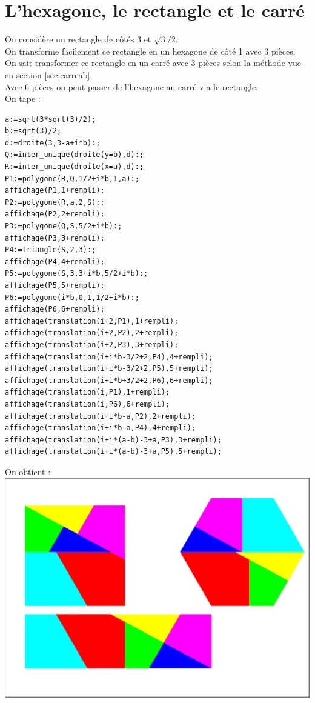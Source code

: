 \documentclass[a4paper,11pt]{book}
\begin{document}
\section{L'hexagone, le rectangle et le carr\'e}
On consid\`ere un rectangle de c\^ot\'es 3 et $\sqrt 3/2$.\\
On transforme facilement ce rectangle en un hexagone de c\^ot\'e 1 avec 3 
pi\`eces.\\
On sait transformer ce rectangle en un carr\'e avec 3 pi\`eces selon la 
m\'ethode vue en section \ref{sec:carreab}.\\  
Avec 6 pi\`eces on peut passer de l'hexagone au carr\'e via le rectangle.\\
On tape :
\begin{verbatim}
a:=sqrt(3*sqrt(3)/2);
b:=sqrt(3)/2;
d:=droite(3,3-a+i*b):;
Q:=inter_unique(droite(y=b),d):;
R:=inter_unique(droite(x=a),d):;
P1:=polygone(R,Q,1/2+i*b,1,a):;
affichage(P1,1+rempli);
P2:=polygone(R,a,2,S):;
affichage(P2,2+rempli);
P3:=polygone(Q,S,5/2+i*b):;
affichage(P3,3+rempli);
P4:=triangle(S,2,3):;
affichage(P4,4+rempli);
P5:=polygone(S,3,3+i*b,5/2+i*b):;
affichage(P5,5+rempli);
P6:=polygone(i*b,0,1,1/2+i*b):;
affichage(P6,6+rempli);
affichage(translation(i+2,P1),1+rempli);
affichage(translation(i+2,P2),2+rempli);
affichage(translation(i+2,P3),3+rempli);
affichage(translation(i+i*b-3/2+2,P4),4+rempli);
affichage(translation(i+i*b-3/2+2,P5),5+rempli);
affichage(translation(i+i*b+3/2+2,P6),6+rempli);
affichage(translation(i,P1),1+rempli);
affichage(translation(i,P6),6+rempli);
affichage(translation(i+i*b-a,P2),2+rempli);
affichage(translation(i+i*b-a,P4),4+rempli);
affichage(translation(i+i*(a-b)-3+a,P3),3+rempli);
affichage(translation(i+i*(a-b)-3+a,P5),5+rempli);
\end{verbatim}
On obtient :\\
\includegraphics[width=\textwidth]{carrehexa}
\end{document}
